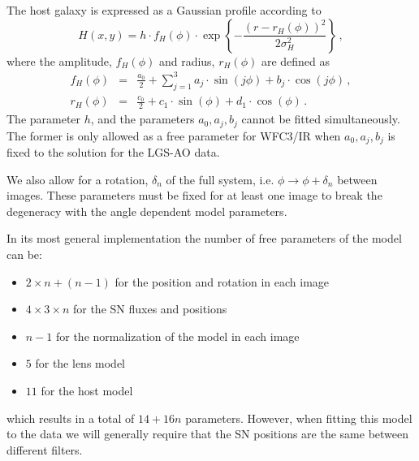 \documentclass[a4paper,fleqn,usenatbib]{mnras}
\newcommand{\wfcir}{WFC3/IR\xspace}
\begin{document}
The host galaxy is expressed as a Gaussian profile according to
\begin{equation}
	H(x,y) = h\cdot f_H(\phi)\cdot\exp\left\{-\frac{(r - r_H(\phi))^2}{2\sigma_H^2}\right\}\, ,\label{eq:host}
\end{equation}
where  the amplitude, $f_H(\phi)$ and radius, $r_H(\phi)$ are defined as
\begin{eqnarray}
f_H(\phi) & = & \frac{a_0}{2} + \sum\limits_{j=1}^3 a_j\cdot\sin(j\phi) + b_j\cdot\cos(j\phi)\, ,\label{eq:hostflux} \\ 
r_H(\phi) & = & \frac{c_0}{2} +  c_1\cdot\sin(\phi) + d_1\cdot\cos(\phi)\, .\label{eq:hostradius}
\end{eqnarray}
The parameter $h$, and the parameters $a_0, a_j, b_j$ cannot be fitted simultaneously.  The former is only allowed as a free parameter
for \wfcir when $a_0, a_j, b_j$ is fixed to the solution for the LGS-AO data.

We also allow for a rotation, $\delta_n$ of the full system, i.e. $\phi \rightarrow \phi + \delta_n$ between images.  These parameters 
must be fixed for at least one image to break the degeneracy with the angle dependent model parameters.

In its most general implementation the number of free parameters of the model can be:
\begin{itemize}
\item $2\times n + (n-1)$ for the position and rotation in each image
\item $4\times 3 \times n$ for the SN fluxes and positions
\item $n-1$ for the normalization of the model in each image
\item $5$ for the lens model
\item $11$ for the host model
\end{itemize}
which results in a total of $14 + 16n$ parameters.  However, when fitting this model to the data we will generally require 
that the SN positions are the same between different filters.  


\end{document}
